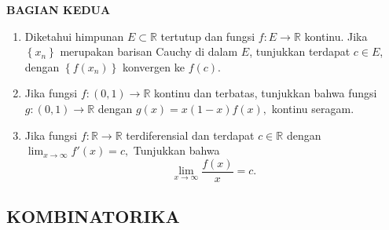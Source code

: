 \documentclass[12pt,twoside]{article}
\begin{document}
\newpage \textbf{BAGIAN KEDUA}

\begin{enumerate}
	\item Diketahui himpunan $E \subset \mathbb{R}$ tertutup dan fungsi $f : E \to \mathbb{R}$ kontinu. Jika $\left\lbrace x_n \right\rbrace$ merupakan barisan Cauchy di dalam $E$, tunjukkan terdapat $c \in E$, dengan $\left\lbrace f(x_n) \right\rbrace$ konvergen ke $f(c)$.

	\item Jika fungsi $f:(0,1) \to \mathbb{R}$ kontinu dan terbatas, tunjukkan bahwa fungsi \(g : (0,1) \to \mathbb{R}\) dengan $g(x) = x(1-x)f(x),$ kontinu seragam.

	\item Jika fungsi $f : \mathbb{R} \to \mathbb{R}$ terdiferensial dan terdapat $c \in \mathbb{R}$ dengan $\lim_{x \to \infty} f'(x) = c,$ Tunjukkan bahwa
	      \begin{equation*}
		      \displaystyle\lim_{x \to \infty} \dfrac{f(x)}{x} =c.
	      \end{equation*}

\end{enumerate}
\newpage \subsection{KOMBINATORIKA}
\end{document}
